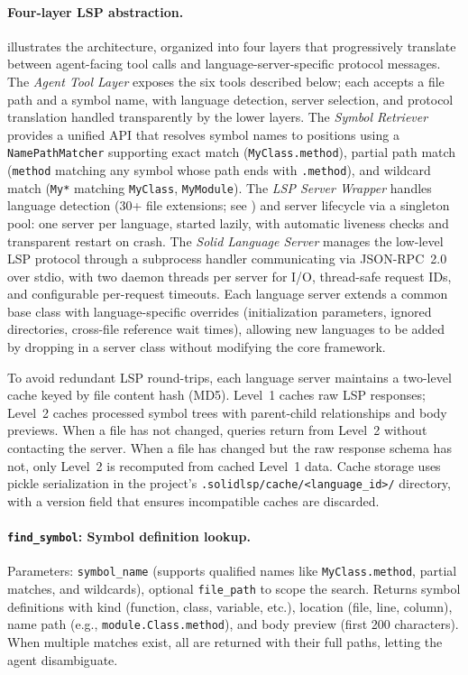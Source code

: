 \paragraph{Four-layer LSP abstraction.}  illustrates the architecture, organized into four layers that progressively translate between agent-facing tool calls and language-server-specific protocol messages. The \emph{Agent Tool Layer} exposes the six tools described below; each accepts a file path and a symbol name, with language detection, server selection, and protocol translation handled transparently by the lower layers. The \emph{Symbol Retriever} provides a unified API that resolves symbol names to positions using a \texttt{NamePathMatcher} supporting exact match (\texttt{MyClass.method}), partial path match (\texttt{method} matching any symbol whose path ends with \texttt{.method}), and wildcard match (\texttt{My*} matching \texttt{MyClass}, \texttt{MyModule}). The \emph{LSP Server Wrapper} handles language detection (30+ file extensions; see ) and server lifecycle via a singleton pool: one server per language, started lazily, with automatic liveness checks and transparent restart on crash. The \emph{Solid Language Server} manages the low-level LSP protocol through a subprocess handler communicating via JSON-RPC~2.0 over stdio, with two daemon threads per server for I/O, thread-safe request IDs, and configurable per-request timeouts. Each language server extends a common base class with language-specific overrides (initialization parameters, ignored directories, cross-file reference wait times), allowing new languages to be added by dropping in a server class without modifying the core framework.

To avoid redundant LSP round-trips, each language server maintains a two-level cache keyed by file content hash (MD5). Level~1 caches raw LSP responses; Level~2 caches processed symbol trees with parent-child relationships and body previews. When a file has not changed, queries return from Level~2 without contacting the server. When a file has changed but the raw response schema has not, only Level~2 is recomputed from cached Level~1 data. Cache storage uses pickle serialization in the project's \texttt{.solidlsp/cache/<language\_id>/} directory, with a version field that ensures incompatible caches are discarded.

\paragraph{\texttt{find\_symbol}: Symbol definition lookup.} Parameters: \texttt{symbol\_name} (supports qualified names like \texttt{MyClass.method}, partial matches, and wildcards), optional \texttt{file\_path} to scope the search. Returns symbol definitions with kind (function, class, variable, etc.), location (file, line, column), name path (e.g., \texttt{module.Class.method}), and body preview (first 200 characters). When multiple matches exist, all are returned with their full paths, letting the agent disambiguate.

